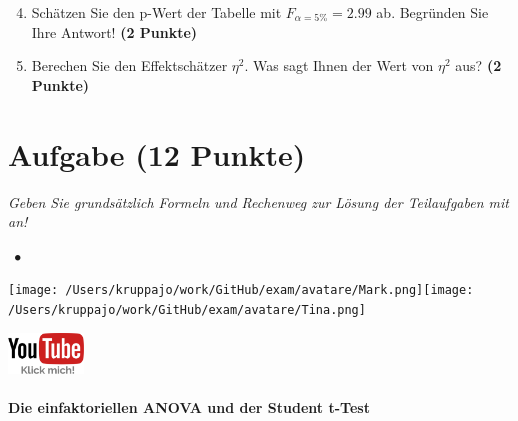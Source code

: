 \documentclass[a4paper, 9pt]{scrartcl}\usepackage[]{graphicx}\usepackage[]{xcolor}
\begin{document}
\vspace{1Ex}

\begin{enumerate}
  \setcounter{enumi}{3}
\item Schätzen Sie den p-Wert der Tabelle mit $F_{\alpha = 5\%} = 2.99$ ab. Begründen Sie Ihre Antwort! \textbf{(2 Punkte)}
\item Berechen Sie den Effektschätzer $\eta^2$. Was sagt Ihnen der Wert von $\eta^2$ aus? \textbf{(2 Punkte)}
\end{enumerate}



 
\clearpage

\section{Aufgabe \hfill (12 Punkte)}

\textit{Geben Sie grundsätzlich Formeln und Rechenweg zur Lösung der Teilaufgaben mit an!} \\[1Ex]
 

 
\ifcollection
\begin{flushright}
\tiny\vspace{-3Ex}
\textbf{\examinhaltstart}
\exammodulestatversuch $\;\bullet$
\exammodulebiostat
\vspace{-4Ex}
\end{flushright}
\begin{minipage}[t]{0.5\textwidth}
\texttt{[image: /Users/kruppajo/work/GitHub/exam/avatare/Mark.png]}\hspace{-4mm}\texttt{[image: /Users/kruppajo/work/GitHub/exam/avatare/Tina.png]}
\end{minipage}
\begin{minipage}[t]{0.5\textwidth}
\hfill
\href{https://youtu.be/49hvImMwVyE}{\includegraphics[width = 2cm]{img/youtube}}
\end{minipage}
\fi



\ifcollection
\paragraph{Die einfaktoriellen ANOVA und der Student t-Test}
\fi
\end{document}
